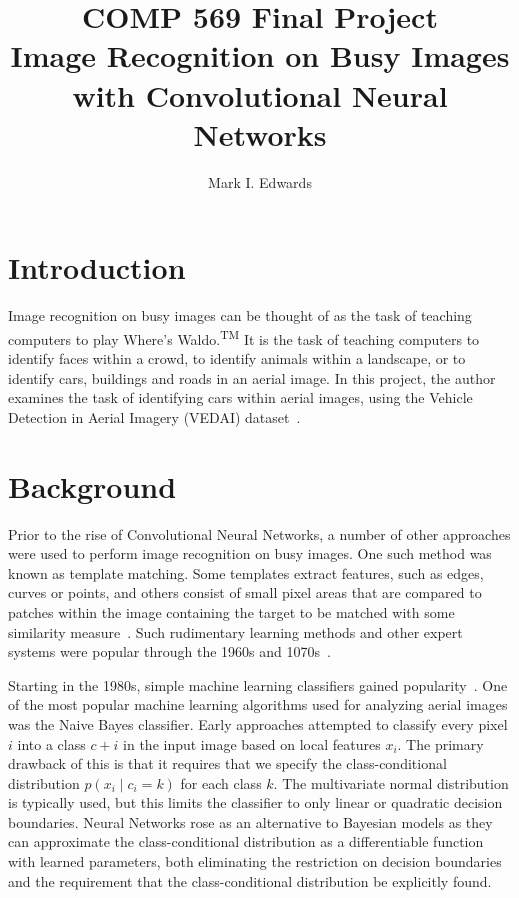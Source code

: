 \documentclass{article}
\title{COMP 569 Final Project\\Image Recognition on Busy Images with Convolutional Neural Networks}
\author{Mark I. Edwards}
\begin{document}
\maketitle
{}

\section*{Introduction}
Image recognition on busy images can be thought of as the task of teaching
computers to play Where's Waldo.\textsuperscript{TM} It is the task of teaching computers to
identify faces within a crowd, to identify animals within a landscape, or to
identify cars, buildings and roads in an aerial image. In this project, the
author examines the task of identifying cars within aerial images, using the
Vehicle Detection in Aerial Imagery (VEDAI) dataset~\cite{vedai_2015}.

\section*{Background}
Prior to the rise of Convolutional Neural Networks, a number of other approaches
were used to perform image recognition on busy images. One such method was known
as template matching. Some templates extract features, such as edges, curves or
points, and others consist of small pixel areas that are compared to patches
within the image containing the target to be matched with some similarity
measure~\cite{perveen_2013}. Such rudimentary learning methods and other expert
systems were popular through the 1960s and 1070s~\cite{minh_thesis}.

Starting in the 1980s, simple machine learning classifiers gained
popularity~\cite{minh_thesis}. One of the most popular machine learning
algorithms used for analyzing aerial images was the Naive Bayes classifier.
Early approaches attempted to classify every pixel $i$ into a class $c+i$ in the
input image based on local features $x_i$. The primary drawback of this is that
it requires that we specify the class-conditional distribution $p(x_i \mid c_i =
k)$ for each class $k$. The multivariate normal distribution is typically used,
but this limits the classifier to only linear or quadratic decision boundaries.
Neural Networks rose as an alternative to Bayesian models as they can
approximate the class-conditional distribution as a differentiable function with
learned parameters, both eliminating the restriction on decision boundaries and
the requirement that the class-conditional distribution be explicitly found. 
\end{document}
